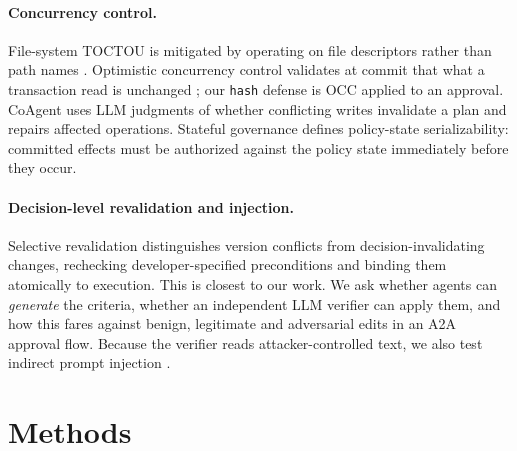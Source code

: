 \documentclass[11pt]{article}
\begin{document}
\paragraph{Concurrency control.}
File-system TOCTOU is mitigated by operating on file descriptors rather than path names
\cite{bishop-toctou}. Optimistic concurrency control validates at commit that what a
transaction read is unchanged \cite{kung-occ}; our \texttt{hash} defense is OCC applied to an
approval. CoAgent \cite{coagent} uses LLM judgments of whether conflicting writes invalidate a
plan and repairs affected operations. Stateful governance \cite{stateful-governance}
defines policy-state serializability: committed effects must be authorized against the policy
state immediately before they occur.

\paragraph{Decision-level revalidation and injection.}
Selective revalidation \cite{selective-revalidation} distinguishes version conflicts from
decision-invalidating changes, rechecking developer-specified preconditions and binding them
atomically to execution. This is closest to our work. We ask whether agents can
\emph{generate} the criteria, whether an independent LLM verifier can apply them, and how this
fares against benign, legitimate and adversarial edits in an A2A approval flow. Because the
verifier reads attacker-controlled text, we also test indirect prompt injection
\cite{greshake-injection}.

\section{Methods}
\end{document}
